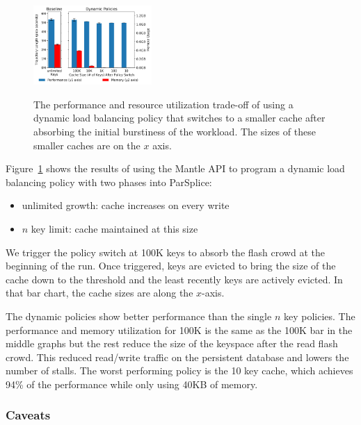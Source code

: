 \begin{figure}[t]
  \noindent\includegraphics[width=0.4\textwidth]{figures/methodology-tradeoff-dynamic.png}\\
  \caption{The performance and resource utilization trade-off of using a
  dynamic load balancing policy that switches to a smaller cache after absorbing
  the initial burstiness of the workload. The sizes of these smaller caches are
  on the \(x\) axis.  \label{fig:methodology-tradeoff-dynamic}}
\end{figure}

Figure~\ref{fig:methodology-tradeoff-dynamic} shows the results of using the
Mantle API to program a dynamic load balancing policy with two phases into
ParSplice:

\begin{itemize}
  \item unlimited growth: cache increases on every write
  \item \(n\) key limit: cache maintained at this size
\end{itemize}

We trigger the policy switch at 100K keys to absorb the flash crowd at the
beginning of the run. Once triggered, keys are evicted to bring the size of the
cache down to the threshold and the least recently keys are actively evicted.
In that bar chart, the cache sizes are along the \(x\)-axis.

The dynamic policies show better performance than the single \(n\) key
policies. The performance and memory utilization for 100K is the same as the
100K bar in the middle graphs but the rest reduce the size of the keyspace
after the read flash crowd. This reduced read/write traffic on the
persistent database and lowers the number of stalls.  The worst performing
policy is the 10 key cache, which achieves 94\% of the performance while only
using 40KB of memory. 

\subsubsection*{Caveats}

